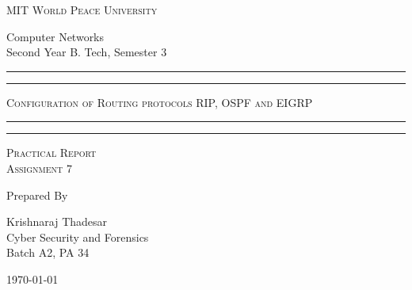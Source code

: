 \documentclass[11pt]{article}
\begin{document}
	
	\begin{titlepage} 
		\centering 
		
		
		\huge\textsc{
			MIT World Peace University
		}\\
	
		\vspace{0.75\baselineskip} %
		
		\LARGE{
			Computer Networks\\
			Second Year B. Tech, Semester 3
		}
		
		\vfill %
		
		
		\rule{\textwidth}{1.6pt}\vspace*{-\baselineskip}\vspace*{2pt}
		\rule{\textwidth}{0.6pt}
		\vspace{0.75\baselineskip} %
		
		
		
		\huge{\textsc{
			Configuration of Routing protocols RIP, OSPF and EIGRP
			}} \\
		
		
		
		\vspace{0.5\baselineskip} %
		\rule{\textwidth}{0.6pt}\vspace*{-\baselineskip}\vspace*{2.8pt}
		\rule{\textwidth}{1.6pt}
		
		\vspace{1\baselineskip} %

			
		\LARGE\textsc{
			Practical Report\\
			Assignment 7
		} %
		\vfill
		
		
		Prepared By
		\vspace{0.5\baselineskip} %
		
		\Large{
			Krishnaraj Thadesar \\
			Cyber Security and Forensics\\
			Batch A2, PA 34
		}
		
		
		\vspace{0.5\baselineskip} %
		\today

	\end{titlepage}
	
\end{document}
